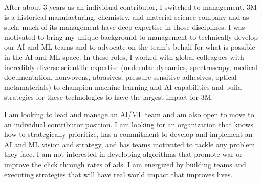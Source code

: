 \documentclass[11pt, a4paper]{awesome-cv}
\begin{document}
\begin{cvletter}
After about 3 years as an individual contributor, I switched to management. 3M is a
historical manufacturing, chemistry, and material science company and as such, much of its
management have deep expertise in those disciplines. I was motivated to bring my unique
background to management to technically develop our AI and ML teams and to advocate on
the team's behalf for what is possible in the AI and ML space. In these roles, I worked
with global colleagues with incredibly diverse scientific expertise (molecular
dynamics, spectroscopy, medical documentation, nonwovens, abrasives, pressure sensitive
adhesives, optical metamaterials) to champion machine learning and AI capabilities
and build strategies for these technologies to have the largest impact for 3M.


I am looking to lead and manage an AI/ML team and am also open to move to an individual
contributor position. I am looking for an organization that knows how to strategically
prioritize, has a commitment to develop and implement an AI and ML vision and strategy,
and has teams motivated to tackle any problem they face. I am not interested in developing
algorithms that promote war or improve the click through rates of ads. I am energized by
building teams and executing strategies that will have real world impact that improves
lives.

\end{cvletter}


\makeletterclosing
\end{document}
